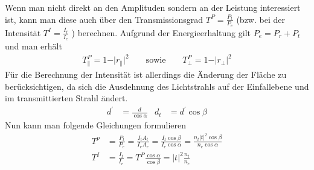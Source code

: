 Wenn man nicht direkt an den Amplituden sondern an der
Leistung interessiert ist, kann man diese auch über den
Transmissionsgrad $T^P=\frac{P_t}{P_e}$ 
(bzw. bei der Intensität
$T^{I}=\frac{I_t}{I_e}$%
%
%
)
berechnen. Aufgrund der Energieerhaltung gilt $P_e=P_r+P_t$ und man
erhält
\begin{gather*}
  T_{\parallel}^P = 1-\vert r_{\parallel}\vert^2
  \qquad\text{sowie}\qquad
  T_{\bot}^P = 1-\vert r_{\bot}\vert^2
\end{gather*}
Für die Berechnung der Intensität ist allerdings die Änderung der
Fläche zu berücksichtigen, da sich die Ausdehnung des Lichtstrahls auf
der Einfallebene und im transmittierten Strahl ändert.
\begin{align*}
  d^\prime &= \frac{d}{\cos\alpha}
  &d_t &= d^\prime\cos\beta 	
\end{align*}
Nun kann man folgende Gleichungen formulieren
\begin{align*}
  T^p &=\frac{P_t}{P_e}
        =\frac{I_t A_t}{I_e A_e}
        =\frac{I_t \cos\beta}{I_e\cos\alpha}
        =\frac{n_t |t|^2 \cos\beta}{n_e\cos\alpha}\\
  T^{I}&=\frac{I_t}{I_e}
         =T^P\frac{\cos\alpha}{\cos\beta}
         = |t|^2\frac{n_t}{n_e}
\end{align*}

